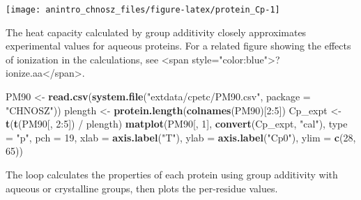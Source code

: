 \documentclass[]{tufte-handout}
\newenvironment{Shaded}{}{}
\newcommand{\KeywordTok}[1]{\textcolor[rgb]{0.00,0.44,0.13}{\textbf{#1}}}
\newcommand{\DataTypeTok}[1]{\textcolor[rgb]{0.56,0.13,0.00}{#1}}
\newcommand{\DecValTok}[1]{\textcolor[rgb]{0.25,0.63,0.44}{#1}}
\newcommand{\StringTok}[1]{\textcolor[rgb]{0.25,0.44,0.63}{#1}}
\newcommand{\OperatorTok}[1]{\textcolor[rgb]{0.40,0.40,0.40}{#1}}
\newcommand{\NormalTok}[1]{#1}
\begin{document}
\begin{marginfigure}
\texttt{[image: anintro\_chnosz\_files/figure-latex/protein\_Cp-1]} \caption[The heat capacity calculated by group additivity closely approximates experimental values for aqueous proteins]{The heat capacity calculated by group additivity closely approximates experimental values for aqueous proteins. For a related figure showing the effects of ionization in the calculations, see <span style="color:blue">?ionize.aa</span>.}\label{fig:protein_Cp}
\end{marginfigure}

\begin{Shaded}
\begin{Highlighting}[]
\NormalTok{PM90 <-}\StringTok{ }\KeywordTok{read.csv}\NormalTok{(}\KeywordTok{system.file}\NormalTok{(}\StringTok{"extdata/cpetc/PM90.csv"}\NormalTok{, }\DataTypeTok{package =} \StringTok{"CHNOSZ"}\NormalTok{))}
\NormalTok{plength <-}\StringTok{ }\KeywordTok{protein.length}\NormalTok{(}\KeywordTok{colnames}\NormalTok{(PM90)[}\DecValTok{2}\OperatorTok{:}\DecValTok{5}\NormalTok{])}
\NormalTok{Cp_expt <-}\StringTok{ }\KeywordTok{t}\NormalTok{(}\KeywordTok{t}\NormalTok{(PM90[, }\DecValTok{2}\OperatorTok{:}\DecValTok{5}\NormalTok{]) }\OperatorTok{/}\StringTok{ }\NormalTok{plength)}
\KeywordTok{matplot}\NormalTok{(PM90[, }\DecValTok{1}\NormalTok{], }\KeywordTok{convert}\NormalTok{(Cp_expt, }\StringTok{"cal"}\NormalTok{), }\DataTypeTok{type =} \StringTok{"p"}\NormalTok{, }\DataTypeTok{pch =} \DecValTok{19}\NormalTok{,}
        \DataTypeTok{xlab =} \KeywordTok{axis.label}\NormalTok{(}\StringTok{"T"}\NormalTok{), }\DataTypeTok{ylab =} \KeywordTok{axis.label}\NormalTok{(}\StringTok{"Cp0"}\NormalTok{), }\DataTypeTok{ylim =} \KeywordTok{c}\NormalTok{(}\DecValTok{28}\NormalTok{, }\DecValTok{65}\NormalTok{))}
\end{Highlighting}
\end{Shaded}

The loop calculates the properties of each protein using group
additivity with aqueous or crystalline groups, then plots the
per-residue values.
\end{document}
